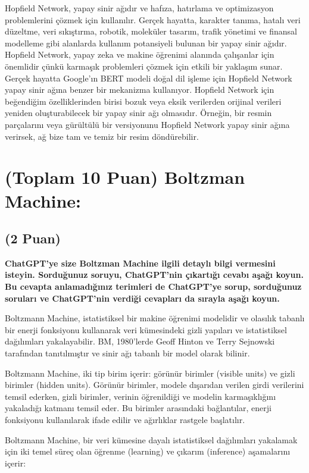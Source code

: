 \documentclass[11pt]{article}
\begin{document}
Hopfield Network, yapay sinir ağıdır ve hafıza, hatırlama ve optimizasyon problemlerini çözmek için kullanılır. Gerçek hayatta, karakter tanıma, hatalı veri düzeltme, veri sıkıştırma, robotik, moleküler tasarım, trafik yönetimi ve finansal modelleme gibi alanlarda kullanım potansiyeli bulunan bir yapay sinir ağıdır. Hopfield Network, yapay zeka ve makine öğrenimi alanında çalışanlar için önemlidir çünkü karmaşık problemleri çözmek için etkili bir yaklaşım sunar. Gerçek hayatta Google’ın BERT modeli doğal dil işleme için Hopfield Network yapay sinir ağına benzer bir mekanizma kullanıyor. Hopfield Network için beğendiğim özelliklerinden birisi bozuk veya eksik verilerden orijinal verileri yeniden oluşturabilecek bir yapay sinir ağı olmasıdır. Örneğin, bir resmin parçalarını veya gürültülü bir versiyonunu Hopfield Network yapay sinir ağına verirsek, ağ bize tam ve temiz bir resim döndürebilir.

\section{(Toplam 10 Puan) Boltzman Machine:}

\subsection{(2 Puan)} \textbf{ChatGPT’ye size Boltzman Machine ilgili detaylı bilgi vermesini isteyin. Sorduğunuz soruyu, ChatGPT'nin çıkartığı cevabı aşağı koyun. Bu cevapta anlamadığınız terimleri de ChatGPT’ye sorup, sorduğunuz soruları ve ChatGPT’nin verdiği cevapları da sırayla aşağı koyun.}

Boltzmann Machine, istatistiksel bir makine öğrenimi modelidir ve olasılık tabanlı bir enerji fonksiyonu kullanarak veri kümesindeki gizli yapıları ve istatistiksel dağılımları yakalayabilir. BM, 1980'lerde Geoff Hinton ve Terry Sejnowski tarafından tanıtılmıştır ve sinir ağı tabanlı bir model olarak bilinir.

Boltzmann Machine, iki tip birim içerir: görünür birimler (visible units) ve gizli birimler (hidden units). Görünür birimler, modele dışarıdan verilen girdi verilerini temsil ederken, gizli birimler, verinin öğrenildiği ve modelin karmaşıklığını yakaladığı katmanı temsil eder. Bu birimler arasındaki bağlantılar, enerji fonksiyonu kullanılarak ifade edilir ve ağırlıklar rastgele başlatılır.

Boltzmann Machine, bir veri kümesine dayalı istatistiksel dağılımları yakalamak için iki temel süreç olan öğrenme (learning) ve çıkarım (inference) aşamalarını içerir:
\end{document}
